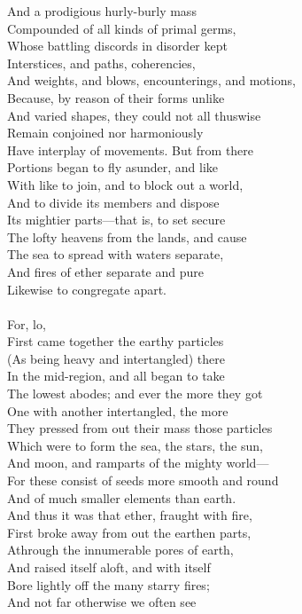 And a prodigious hurly-burly mass\\
Compounded of all kinds of primal germs,\\
Whose battling discords in disorder kept\\
Interstices, and paths, coherencies,\\
And weights, and blows, encounterings, and motions,\\
Because, by reason of their forms unlike\\
And varied shapes, they could not all thuswise\\
Remain conjoined nor harmoniously\\
Have interplay of movements. But from there\\
Portions began to fly asunder, and like\\
With like to join, and to block out a world,\\
And to divide its members and dispose\\
Its mightier parts—that is, to set secure\\
The lofty heavens from the lands, and cause\\
The sea to spread with waters separate,\\
And fires of ether separate and pure\\
Likewise to congregate apart.\\
\\
For, lo,\\
First came together the earthy particles\\
(As being heavy and intertangled) there\\
In the mid-region, and all began to take\\
The lowest abodes; and ever the more they got\\
One with another intertangled, the more\\
They pressed from out their mass those particles\\
Which were to form the sea, the stars, the sun,\\
And moon, and ramparts of the mighty world—\\
For these consist of seeds more smooth and round\\
And of much smaller elements than earth.\\
And thus it was that ether, fraught with fire,\\
First broke away from out the earthen parts,\\
Athrough the innumerable pores of earth,\\
And raised itself aloft, and with itself\\
Bore lightly off the many starry fires;\\
And not far otherwise we often see

